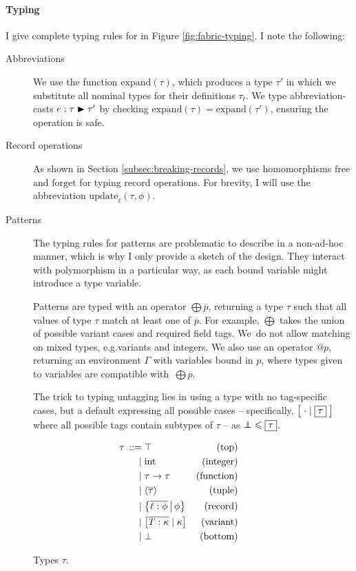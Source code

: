 \paragraph{Typing}

I give complete typing rules for \fabric{} in Figure \ref{fig:fabric-typing}. I note the following:
\begin{description}
    \item[Abbreviations] We use the function $\mathrm{expand}(\tau)$, which produces a type $\tau'$ in which we substitute all nominal types for their definitions $\tau_t$. We type abbreviation-casts ${e} : {\tau} \blacktriangleright {\tau'}$ by checking $\mathrm{expand}(\tau) = \mathrm{expand}(\tau')$, ensuring the operation is safe. 
    \item[Record operations] As shown in Section \ref{subsec:breaking-records}, we use homomorphisms $\mathrm{free}$ and $\mathrm{forget}$ for typing record operations. For brevity, I will use the abbreviation $\mathrm{update}_\ell(\tau, \phi)$.
    \item[Patterns] 
    The typing rules for patterns are problematic to describe in a non-ad-hoc manner, which is why I only provide a sketch of the design. They interact with polymorphism in a particular way, as each bound variable might introduce a type variable.
    
    Patterns are typed with an operator $\bigoplus {\overline p}$, returning a type $\tau$ such that all values of type $\tau$ match at least one of $\overline p$. For example, $\bigoplus$ takes the union of possible variant cases and required field tags. We~do not allow matching on mixed types, e.g.\@ variants and integers.
    We also use an operator $@p$, returning an environment $\Gamma$ with variables bound in $p$, where types given to variables are compatible with~$\bigoplus \overline p$.

    The trick to typing untagging lies in using a type with no tag-specific cases, but a default expressing all possible cases -- specifically, $\fbvar{\;\cdot}{\flpresent \tau\;}$ where all possible tags contain subtypes of $\tau$ -- as $\bot \!\!\!\! \bot \leqslant \boxed{\tau}$.
\end{description}

\begin{figure}[p]
    \centering
\begin{align*}
\graintro \tau 
\top 
& \text{(top)}
\graitem
\sint
& \text{(integer)}
\graitem
\tau \to \tau
& \text{(function)}
\graitem
\fbtuple{\overline \tau}
& \text{(tuple)}
\graitem
\flext{\overline{\ell : \phi}}{\phi} 
& \text{(record)}
\graitem
\fbvar{\overline{T : \kappa}}{\kappa}
& \text{(variant)}
\graitem
\bot
& \text{(bottom)}
\end{align*}
    \caption{Types $\tau$.}
    \label{fig:fabric-types}
\end{figure}

